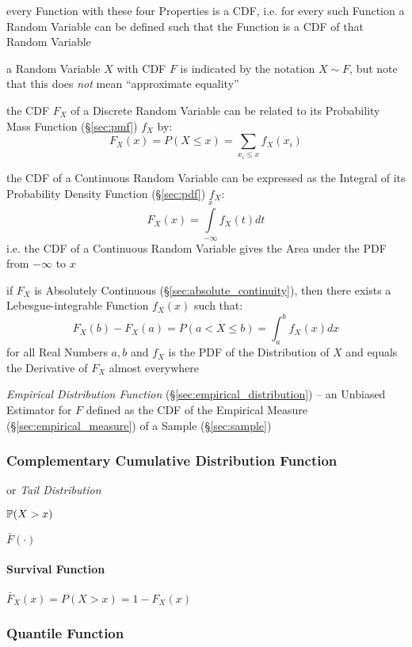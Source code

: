 every Function with these four Properties is a CDF, i.e. for every such Function
a Random Variable can be defined such that the Function is a CDF of that Random
Variable

a Random Variable $X$ with CDF $F$ is indicated by the notation $X \sim F$, but
note that this does \emph{not} mean ``approximate equality''

the CDF $F_X$ of a Discrete Random Variable can be related to its Probability
Mass Function (\S\ref{sec:pmf}) $f_X$ by:
\[
  F_X(x) = P(X \leq x) = \sum_{x_i \leq x} f_X(x_i)
\]

the CDF of a Continuous Random Variable can be expressed as the Integral of its
Probability Density Function (\S\ref{sec:pdf}) $f_X$:
\[
  F_X(x) = \int\limits_{-\infty}^x f_X(t) dt
\]
i.e. the CDF of a Continuous Random Variable gives the Area under the PDF from
$-\infty$ to $x$

if $F_X$ is Absolutely Continuous (\S\ref{sec:absolute_continuity}), then there
exists a Lebesgue-integrable Function $f_X(x)$ such that:
\[
  F_X(b) - F_X(a) = P(a < X \leq b) = \int_a^b f_X(x) dx
\]
for all Real Numbers $a, b$ and $f_X$ is the PDF of the Distribution of $X$
and equals the Derivative of $F_X$ almost everywhere

\fist \emph{Empirical Distribution Function}
(\S\ref{sec:empirical_distribution}) -- an Unbiased Estimator for $F$ defined as
the CDF of the Empirical Measure (\S\ref{sec:empirical_measure}) of a Sample
(\S\ref{sec:sample})



\subsubsection{Complementary Cumulative Distribution Function}
\label{sec:complementary_cumulative}

or \emph{Tail Distribution}

$\mathbb{P}(X > x)$

$\bar{F}(\cdot)$



\paragraph{Survival Function}\label{sec:survival_function}\hfill

$\bar{F}_X(x) = P(X > x) = 1 - F_X(x)$



\subsubsection{Quantile Function}\label{sec:quantile_function}

